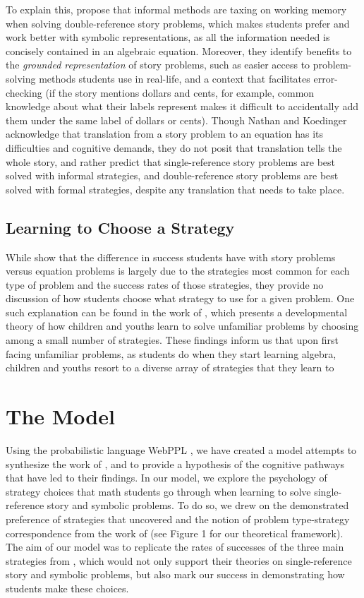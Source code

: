 \documentclass[10pt,letterpaper]{article}
\begin{document}
	To explain this,  propose that informal methods are taxing on working memory when solving double-reference story problems, which makes students prefer and work better with symbolic representations, as all the information needed is concisely contained in an algebraic equation. Moreover, they identify benefits to the \textit{grounded representation} of story problems, such as easier access to problem-solving methods students use in real-life, and a context that facilitates error-checking (if the story mentions dollars and cents, for example, common knowledge about what their labels represent makes it difficult to accidentally add them under the same label of dollars or cents). Though Nathan and Koedinger acknowledge that translation from a story problem to an equation has its difficulties and cognitive demands, they do not posit that translation tells the whole story, and rather predict that single-reference story problems are best solved with informal strategies, and double-reference story problems are best solved with formal strategies, despite any translation that needs to take place.
	
	\subsection{Learning to Choose a Strategy}
	
	While  show that the difference in success students have with story problems versus equation problems is largely due to the strategies most common for each type of problem and the success rates of those strategies, they provide no discussion of how students choose what strategy to use for a given problem. One such explanation can be found in the work of , which presents a developmental theory of how children and youths learn to solve unfamiliar problems by choosing among a small number of strategies. These findings inform us that upon first facing unfamiliar problems, as students do when they start learning algebra, children and youths resort to a diverse array of strategies that they learn to 
	
	\section{The Model}
	
	Using the probabilistic language WebPPL \cite{dippl}, we have created a model attempts to synthesize the work of ,  and  to provide a hypothesis of the cognitive pathways that have led to their findings. In our model, we explore the psychology of strategy choices that math students go through when learning to solve single-reference story and symbolic problems. To do so, we drew on the demonstrated preference of strategies that  uncovered and the notion of problem type-strategy correspondence from the work of  (see Figure 1 for our theoretical framework). The aim of our model was to replicate the rates of successes of the three main strategies from \cite{KoedNath2004}, which would not only support their theories on single-reference story and symbolic problems, but also mark our success in demonstrating how students make these choices. 
	
\end{document}

